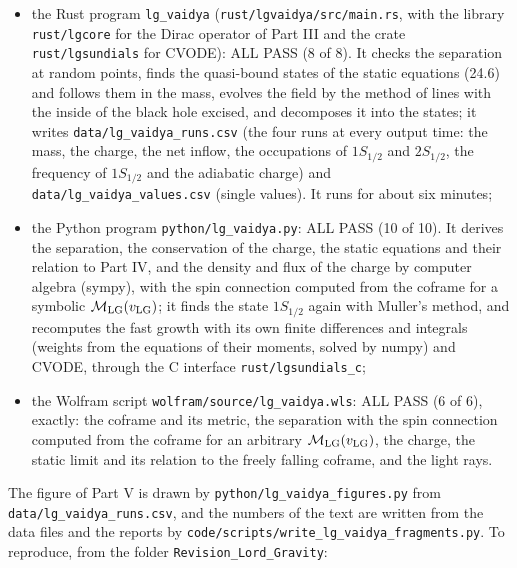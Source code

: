 \documentclass[
  10pt,
]{article}
\providecommand{\tightlist}{%
  \setlength{\itemsep}{0pt}\setlength{\parskip}{0pt}}
\begin{document}
\begin{itemize}
\tightlist
\item
  the Rust program \texttt{lg\_vaidya}
  (\texttt{rust/lgvaidya/src/main.rs}, with the library
  \texttt{rust/lgcore} for the Dirac operator of Part III and the crate
  \texttt{rust/lgsundials} for CVODE): ALL PASS (8 of 8). It checks the
  separation at random points, finds the quasi-bound states of the
  static equations (24.6) and follows them in the mass, evolves the
  field by the method of lines with the inside of the black hole
  excised, and decomposes it into the states; it writes
  \texttt{data/lg\_vaidya\_runs.csv} (the four runs at every output
  time: the mass, the charge, the net inflow, the occupations of
  \(1S_{1/2}\) and \(2S_{1/2}\), the frequency of \(1S_{1/2}\) and the
  adiabatic charge) and \texttt{data/lg\_vaidya\_values.csv} (single
  values). It runs for about six minutes;
\item
  the Python program \texttt{python/lg\_vaidya.py}: ALL PASS (10 of 10).
  It derives the separation, the conservation of the charge, the static
  equations and their relation to Part IV, and the density and flux of
  the charge by computer algebra (sympy), with the spin connection
  computed from the coframe for a symbolic
  \(\mathcal M_{\rm LG}(v_{\rm LG})\); it finds the state \(1S_{1/2}\)
  again with Muller's method, and recomputes the fast growth with its
  own finite differences and integrals (weights from the equations of
  their moments, solved by numpy) and CVODE, through the C interface
  \texttt{rust/lgsundials\_c};
\item
  the Wolfram script \texttt{wolfram/source/lg\_vaidya.wls}: ALL PASS (6
  of 6), exactly: the coframe and its metric, the separation with the
  spin connection computed from the coframe for an arbitrary
  \(\mathcal M_{\rm LG}(v_{\rm LG})\), the charge, the static limit and
  its relation to the freely falling coframe, and the light rays.
\end{itemize}

The figure of Part V is drawn by \texttt{python/lg\_vaidya\_figures.py}
from \texttt{data/lg\_vaidya\_runs.csv}, and the numbers of the text are
written from the data files and the reports by
\texttt{code/scripts/write\_lg\_vaidya\_fragments.py}. To reproduce,
from the folder \texttt{Revision\_Lord\_Gravity}:
\end{document}
